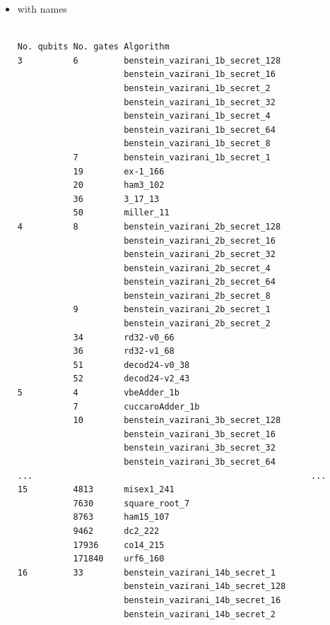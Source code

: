 \begin{itemize}
\begin{verbatim}
[180 rows x 1 columns]

\end{verbatim}

\item with names
\label{sec:org63344ab}

\begin{verbatim}

No. qubits No. gates Algorithm
3          6         benstein_vazirani_1b_secret_128 
                     benstein_vazirani_1b_secret_16  
                     benstein_vazirani_1b_secret_2   
                     benstein_vazirani_1b_secret_32  
                     benstein_vazirani_1b_secret_4   
                     benstein_vazirani_1b_secret_64  
                     benstein_vazirani_1b_secret_8   
           7         benstein_vazirani_1b_secret_1   
           19        ex-1_166                        
           20        ham3_102                        
           36        3_17_13                         
           50        miller_11                       
4          8         benstein_vazirani_2b_secret_128 
                     benstein_vazirani_2b_secret_16  
                     benstein_vazirani_2b_secret_32  
                     benstein_vazirani_2b_secret_4   
                     benstein_vazirani_2b_secret_64  
                     benstein_vazirani_2b_secret_8   
           9         benstein_vazirani_2b_secret_1   
                     benstein_vazirani_2b_secret_2   
           34        rd32-v0_66                      
           36        rd32-v1_68                      
           51        decod24-v0_38                   
           52        decod24-v2_43                   
5          4         vbeAdder_1b                     
           7         cuccaroAdder_1b                 
           10        benstein_vazirani_3b_secret_128 
                     benstein_vazirani_3b_secret_16  
                     benstein_vazirani_3b_secret_32  
                     benstein_vazirani_3b_secret_64  
...                                                       ...
15         4813      misex1_241                      
           7630      square_root_7                   
           8763      ham15_107                       
           9462      dc2_222                         
           17936     co14_215                        
           171840    urf6_160                        
16         33        benstein_vazirani_14b_secret_1  
                     benstein_vazirani_14b_secret_128
                     benstein_vazirani_14b_secret_16 
                     benstein_vazirani_14b_secret_2  

\end{verbatim}
\end{itemize}
